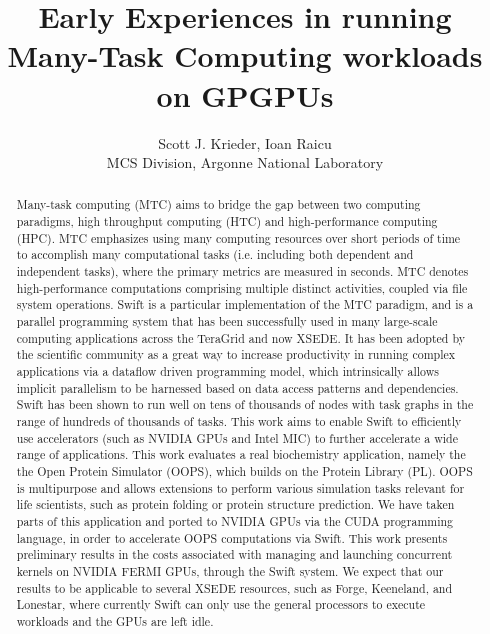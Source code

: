 \documentclass[conference]{IEEEtran}
\begin{document}
%
\title{Early Experiences in running Many-Task Computing workloads on GPGPUs}


\author{Scott J. Krieder,
Ioan Raicu\\
MCS Division, Argonne National Laboratory
}


\maketitle

\begin{abstract}
Many-task computing (MTC) aims to bridge the gap between two computing paradigms, high throughput computing (HTC) and high-performance computing (HPC). MTC emphasizes using many computing resources over short periods of time to accomplish many computational tasks (i.e. including both dependent and independent tasks), where the primary metrics are measured in seconds. MTC denotes high-performance computations comprising multiple distinct activities, coupled via file system operations. Swift is a particular implementation of the MTC paradigm, and is a parallel programming system that has been successfully used in many large-scale computing applications across the TeraGrid and now XSEDE. It has been adopted by the scientific community as a great way to increase productivity in running complex applications via a dataflow driven programming model, which intrinsically allows implicit parallelism to be harnessed based on data access patterns and dependencies. Swift has been shown to run well on tens of thousands of nodes with task graphs in the range of hundreds of thousands of tasks. This work aims to enable Swift to efficiently use accelerators (such as NVIDIA GPUs and
Intel MIC) to further accelerate a wide range of applications. This work evaluates a real biochemistry application, namely the the Open Protein Simulator (OOPS), which builds on the Protein Library (PL). OOPS is multipurpose and allows extensions to perform various simulation tasks relevant for life scientists, such as protein folding or protein structure prediction. We have taken parts of this application and ported to NVIDIA GPUs via the CUDA programming language, in order to accelerate OOPS computations via Swift. This work presents preliminary results in the costs associated with managing and launching concurrent kernels on NVIDIA FERMI GPUs, through the Swift system. We expect that our results to be applicable to several XSEDE resources, such as Forge, Keeneland, and Lonestar, where currently Swift can only use the general processors to execute workloads and the GPUs are left idle.
\end{abstract}
\end{document}
